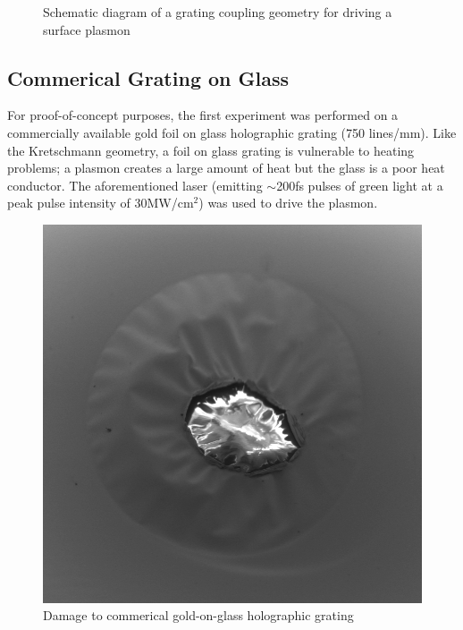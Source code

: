 \begin{figure}
  \centering
  
  \caption[Grating coupling geometry for driving a surface plasmon]{Schematic diagram of a grating coupling geometry for driving a surface plasmon}
  \label{fig:plasmon_schematic}
\end{figure}

\subsection{Commerical Grating on Glass}

For proof-of-concept purposes, the first experiment was performed on a commercially available gold foil on glass holographic grating (750 lines/mm).
Like the Kretschmann geometry, a foil on glass grating is vulnerable to heating problems; a plasmon creates a large amount of heat but the glass is a poor heat conductor.
The aforementioned laser (emitting $\sim$200fs pulses of green light at a peak pulse intensity of 30MW/cm$^2$) was used to drive the plasmon.

\begin{figure}
  \centering
  \includegraphics{damage.png}
  \caption{Damage to commerical gold-on-glass holographic grating}
  \label{fig:grating-damage}
\end{figure}

